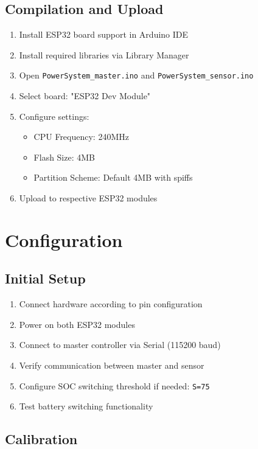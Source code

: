 \documentclass[11pt,a4paper]{article}
\begin{document}
\subsection{Compilation and Upload}

\begin{enumerate}
    \item Install ESP32 board support in Arduino IDE
    \item Install required libraries via Library Manager
    \item Open \texttt{PowerSystem\_master.ino} and \texttt{PowerSystem\_sensor.ino}
    \item Select board: "ESP32 Dev Module"
    \item Configure settings:
    \begin{itemize}
        \item CPU Frequency: 240MHz
        \item Flash Size: 4MB
        \item Partition Scheme: Default 4MB with spiffs
    \end{itemize}
    \item Upload to respective ESP32 modules
\end{enumerate}

\section{Configuration}

\subsection{Initial Setup}

\begin{enumerate}
    \item Connect hardware according to pin configuration
    \item Power on both ESP32 modules
    \item Connect to master controller via Serial (115200 baud)
    \item Verify communication between master and sensor
    \item Configure SOC switching threshold if needed: \texttt{S=75}
    \item Test battery switching functionality
\end{enumerate}

\subsection{Calibration}
\end{document}
